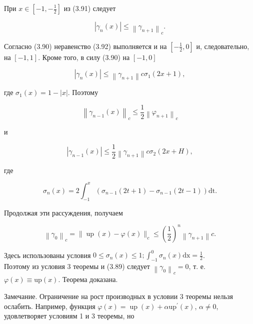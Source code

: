 \documentclass[10pt]{article}
\begin{document}
При $x \in\left[-1,-\frac{1}{2}\right]$ из (3.91) следует


\begin{equation*}
\left|\gamma_{n}(x)\right| \leqslant\left\|\gamma_{n+1}\right\|_{c} . \tag{3:92}
\end{equation*}


Согласно (3.90) неравенство (3.92) выполняется и на $\left[-\frac{1}{2}, 0\right]$ и, следовательно, на $[-1,1]$. Кроме того, в силу (3.90) на $[-1,0]$


\begin{equation*}
\left|\gamma_{n}(x)\right| \leqslant\left\|\gamma_{n+1}\right\| c \sigma_{1}(2 x+1), \tag{3.93}
\end{equation*}


где $\sigma_{1}(x)=1-|x|$. Поэтому


\begin{equation*}
\left\|\gamma_{n-1}(x)\right\|_{c} \leqslant \frac{1}{2}\left\|\varphi_{n+1}\right\|_{c} \tag{3.94}
\end{equation*}


и


\begin{equation*}
\left|\gamma_{n-1}(x)\right| \leqslant \frac{1}{2}\left\|\gamma_{n+1}\right\| c \sigma_{2}(2 x+H), \tag{3.95}
\end{equation*}


где


\begin{equation*}
\sigma_{n}(x)=2 \int_{-1}^{x}\left(\sigma_{n-1}(2 t+1)-\sigma_{n-1}(2 t-1)\right) \mathrm{dt} . \tag{3.96}
\end{equation*}


Продолжая эти рассуждения, получаем


\begin{equation*}
\left\|\gamma_{0}\right\|_{c}=\|\operatorname{up}(x)-\varphi(x)\|_{c} \leqslant\left(\frac{1}{2}\right)^{n}\left\|\gamma_{n+1}\right\| c . \tag{3.97}
\end{equation*}


Здесь использованы условия $0 \leqslant \sigma_{n}(x) \leqslant 1 ; \int_{-1}^{0} \sigma_{n}(x) \mathrm{dx}=\frac{1}{2}$.\\
Поэтому из условия 3 теоремы и (3.89) следует $\left\|\gamma_{0}\right\|_{c}=0$, т. е. $\varphi(x) \equiv \mathrm{up}(x)$. Теорема доказана.

Замечание. Ограничение на рост производных в условии 3 теоремы нельзя ослабить. Например, функция $\varphi(x)=\operatorname{up}(x)+\alpha \mathrm{up}^{\prime}(x)$, $\alpha \neq 0$, удовлетворяет условиям 1 и 3 теоремы, но
\end{document}
